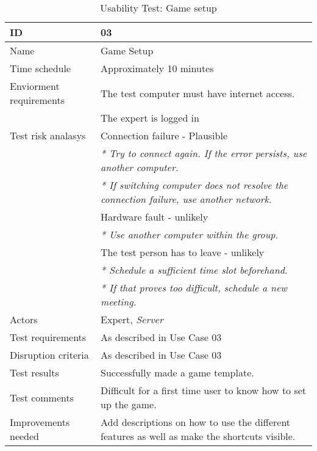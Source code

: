 {\footnotesize
\begin{table}[H]
\begin{tabular}{| p{5cm} | p{10cm} |}\hline
	\textbf{ID}	& \textbf{03} \\ \hline
	Name		& Game Setup\\ \hline
	Time schedule	& Approximately 10 minutes\\ \hline
	Enviorment requirements 
		& The test computer must have internet access. \\
		& The expert is logged in\\ \hline
	Test risk analasys 
		& Connection failure - Plausible \\
		& \emph{* Try to connect again. If the error persists, use another computer.} \\
		& \emph{* If switching computer does not resolve the connection failure, use another network.}\\
		& Hardware fault - unlikely \\
		& \emph{* Use another computer within the group.} \\
		& The test person has to leave - unlikely \\
		& \emph{* Schedule a sufficient time slot beforehand.} \\
		& \emph{* If that proves too difficult, schedule a new meeting.}\\ \hline
	Actors	& Expert, \emph{Server}\\ \hline
	Test requirements & As described in Use Case 03 \\ \hline
	Disruption criteria & As described in Use Case 03  \\ \hline
	Test results & Successfully made a game template.
		\\ \hline
	Test comments & Difficult for a first time user to know how to set up the game.
		\\ \hline
	Improvements needed & Add descriptions on how to use the different features as well as make the shortcuts visible. 
		\\ \hline
\end{tabular}


\caption{Usability Test: Game setup}
\label{fig:usability_test_3}
\end{table}}




